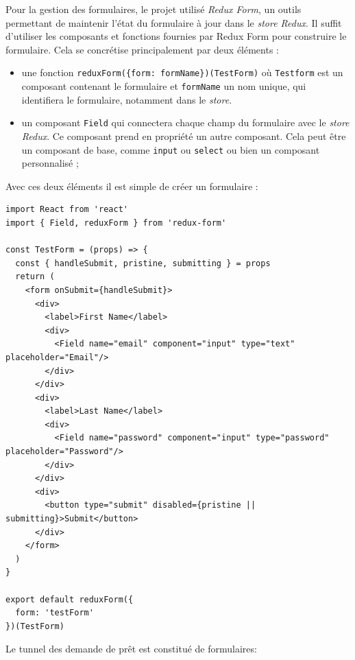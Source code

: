 \bigskip

Pour la gestion des formulaires, le projet utilisé \emph{Redux Form}, un
outils permettant de maintenir l'état du formulaire à jour dans le
\emph{store Redux}. Il suffit d'utiliser les composants et fonctions
fournies par Redux Form pour construire le formulaire. Cela se
concrétise principalement par deux éléments :

\begin{itemize}
\tightlist
\item
  une fonction
  \texttt{reduxForm(\{form:\ \textquotesingle{}formName\textquotesingle{}\})(TestForm)}
  où \texttt{Testform} est un composant contenant le formulaire et
  \texttt{formName} un nom unique, qui identifiera le formulaire,
  notamment dans le \emph{store}.
\item
  un composant \texttt{Field} qui connectera chaque champ du formulaire
  avec le \emph{store Redux}. Ce composant prend en propriété un autre
  composant. Cela peut être un composant de base, comme \texttt{input}
  ou \texttt{select} ou bien un composant personnalisé ;
\end{itemize}

Avec ces deux éléments il est simple de créer un formulaire :

\begin{verbatim}
import React from 'react'
import { Field, reduxForm } from 'redux-form'

const TestForm = (props) => {
  const { handleSubmit, pristine, submitting } = props
  return (
    <form onSubmit={handleSubmit}>
      <div>
        <label>First Name</label>
        <div>
          <Field name="email" component="input" type="text" placeholder="Email"/>
        </div>
      </div>
      <div>
        <label>Last Name</label>
        <div>
          <Field name="password" component="input" type="password" placeholder="Password"/>
        </div>
      </div>
      <div>
        <button type="submit" disabled={pristine || submitting}>Submit</button>
      </div>
    </form>
  )
}

export default reduxForm({
  form: 'testForm'
})(TestForm)
\end{verbatim}

\bigskip

Le tunnel des demande de prêt est constitué de formulaires:

